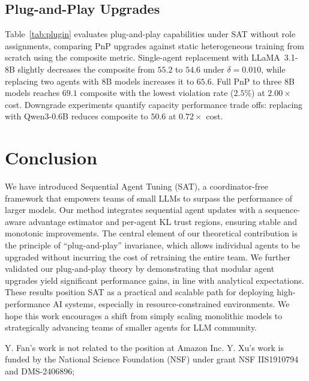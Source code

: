 \documentclass[sigconf]{aamas}
\begin{document}
\subsection{Plug-and-Play Upgrades}
\label{sec:plugin}

Table~\ref{tab:plugin} evaluates plug-and-play capabilities under SAT without role assignments, comparing PnP upgrades against static heterogeneous training from scratch using the composite metric. Single-agent replacement with LLaMA~3.1-8B slightly decreases the composite from $55.2$ to $54.6$ under $\delta=0.010$, while replacing two agents with 8B models increases it to $65.6$. Full PnP to three 8B models reaches $69.1$ composite with the lowest violation rate ($2.5\%$) at $2.00\times$ cost. Downgrade experiments quantify capacity performance trade offs: replacing with Qwen3-0.6B reduces composite to $50.6$ at $0.72\times$ cost. 

\section{Conclusion}
We have introduced Sequential Agent Tuning (SAT), a coordinator-free framework that empowers teams of small LLMs to surpass the performance of larger models. Our method integrates sequential agent updates with a sequence-aware advantage estimator and per-agent KL trust regions, ensuring stable and monotonic improvements. The central element of our theoretical contribution is the principle of “plug-and-play” invariance, which allows individual agents to be upgraded without incurring the cost of retraining the entire team. We further validated our plug-and-play theory by demonstrating that modular agent upgrades yield significant performance gains, in line with analytical expectations. These results position SAT as a practical and scalable path for deploying high-performance AI systems, especially in resource-constrained environments. We hope this work encourages a shift from simply scaling monolithic models to strategically advancing teams of smaller agents for LLM community.

\begin{acks}
Y. Fan's work is not related to the position at Amazon Inc. Y. Xu's work is funded by the National Science Foundation (NSF) under grant NSF IIS1910794 and DMS-2406896;
\end{acks}

\clearpage
 


 
\end{document}
